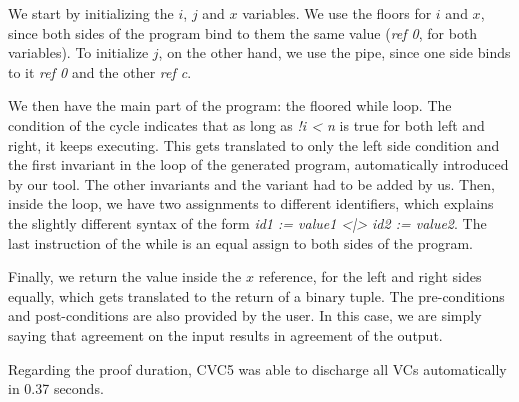 We start by initializing the $i$, $j$ and $x$ variables.
We use the floors for $i$ and $x$, since both sides of the program bind to them the same value (\emph{ref 0}, for both variables).
To initialize $j$, on the other hand, we use the pipe, since one side binds to it \emph{ref 0} and the other \emph{ref c}.

We then have the main part of the program: the floored while loop.
The condition of the cycle indicates that as long as \emph{!i < n} is true for both left and right, it keeps executing.
This gets translated to only the left side condition and the first invariant in the loop of the generated program, automatically introduced by our tool.
The other invariants and the variant had to be added by us.
Then, inside the loop, we have two assignments to different identifiers, which explains the slightly different syntax of the form \emph{id1 := value1 <|> id2 := value2}.
The last instruction of the while is an equal assign to both sides of the program.

Finally, we return the value inside the $x$ reference, for the left and right sides equally, which gets translated to the return of a binary tuple.
The pre-conditions and post-conditions are also provided by the user.
In this case, we are simply saying that agreement on the input results in agreement of the output.

Regarding the proof duration, CVC5 was able to discharge all VCs automatically in 0.37 seconds.

